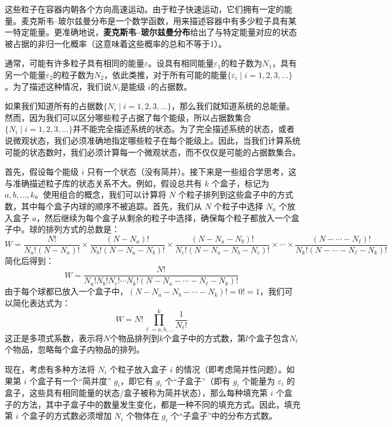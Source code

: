 这些粒子在容器内朝各个方向高速运动。由于粒子快速运动，它们拥有一定的能量。麦克斯韦–玻尔兹曼分布是一个数学函数，用来描述容器中有多少粒子具有某一特定能量。更准确地说，\textbf{麦克斯韦–玻尔兹曼分布}给出了与特定能量对应的状态被占据的非归一化概率（这意味着这些概率的总和不等于1）。

通常，可能有许多粒子具有相同的能量\( \varepsilon \)。设具有相同能量\( \varepsilon_1\)的粒子数为\( N_1 \)，具有另一个能量\(\varepsilon_2 \)的粒子数为\(N_2\)，依此类推，对于所有可能的能量\(\{\varepsilon_i \mid i = 1, 2, 3, \dots\}\)。为了描述这种情况，我们说\( N_i \)是能级 \(i\)的占据数。

如果我们知道所有的占据数\(\{N_i \mid i = 1, 2,3,\dots\}\)，那么我们就知道系统的总能量。然而，因为我们可以区分哪些粒子占据了每个能级，所以占据数集合\(\{N_i \mid i = 1, 2, 3, \dots\}\)并不能完全描述系统的状态。为了完全描述系统的状态，或者说微观状态，我们必须准确地指定哪些粒子在每个能级上。因此，当我们计算系统可能的状态数时，我们必须计算每一个微观状态，而不仅仅是可能的占据数集合。

首先，假设每个能级 \( i \) 只有一个状态（没有简并）。接下来是一些组合学思考，这与准确描述粒子库的状态关系不大。例如，假设总共有 \( k \) 个盒子，标记为 \( a, b, \dots, k \)。使用组合的概念，我们可以计算将 \( N \) 个粒子排列到这些盒子中的方式数，其中每个盒子内球的顺序不被追踪。首先，我们从 \( N \) 个粒子中选择 \( N_a \) 个放入盒子 \( a \)，然后继续为每个盒子从剩余的粒子中选择，确保每个粒子都放入一个盒子中。球的排列方式的总数是：
\[
W = \frac{N!}{N_a!(N - N_a)!} \times \frac{(N - N_a)!}{N_b!(N - N_a - N_b)!} \times \frac{(N - N_a - N_b)!}{N_c!(N - N_a - N_b - N_c)!} \times \cdots \times \frac{(N - \cdots - N_\ell)!}{N_k!(N - \cdots - N_\ell - N_k)!}~
\]
简化后得到：
\[
W = \frac{N!}{N_a! N_b! N_c! \cdots N_k!(N - N_a - \cdots - N_\ell - N_k)!}~
\]
由于每个球都已放入一个盒子中，\((N - N_a - N_b - \cdots - N_k)! = 0! = 1\)，我们可以简化表达式为：
\[
W = N! \prod_{\ell = a,b,\ldots}^{k} \frac{1}{N_{\ell}!}~
\]
这正是多项式系数，表示将\( N \)个物品排列到\( k \)个盒子中的方式数，第\( l \)个盒子包含\( N_l \)个物品，忽略每个盒子内物品的排列。

现在，考虑有多种方法将 \( N_i \) 个粒子放入盒子 \( i \) 的情况（即考虑简并性问题）。如果第 \( i \) 个盒子有一个“简并度” \( g_i \)，即它有 \( g_i \) 个“子盒子”（即有 \( g_i \) 个能量为 \( \varepsilon_i \) 的盒子，这些具有相同能量的状态/盒子被称为简并状态），那么每种填充第 \( i \) 个盒子的方法，其中子盒子中的数量发生变化，都是一种不同的填充方式。因此，填充第 \( i \) 个盒子的方式数必须增加 \( N_i \) 个物体在 \( g_i \) 个“子盒子”中的分布方式数。

